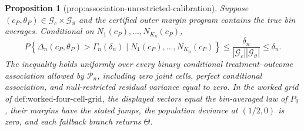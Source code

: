\documentclass{article}
\newtheorem{proposition}{Proposition}
\begin{document}
\begin{proposition}[prop:association-unrestricted-calibration]\label{prop:association-unrestricted-calibration}
Suppose \((c_P,\theta_P)\in\mathcal G_c\times\mathcal G_\vartheta\) and the certified outer margin program contains the true bin averages. Conditional on \(N_1(c_P),\ldots,N_{K_n}(c_P)\), \[P\!\left\{\Delta_n(c_P,\theta_P)>\Gamma_n(\delta_n)\mid N_1(c_P),\ldots,N_{K_n}(c_P)\right\}\le\frac{\delta_n}{|\mathcal G_c||\mathcal G_\vartheta|}\le\delta_n.\] The inequality holds uniformly over every binary conditional treatment--outcome association allowed by \(\mathcal P_n\), including zero joint cells, perfect conditional association, and null-restricted residual variance equal to zero. In the worked grid of \(\text{def:worked-four-cell-grid}\), the displayed vectors equal the bin-averaged law of \(P_0\), their margins have the stated jumps, the population deviance at \((1/2,0)\) is zero, and each fallback branch returns \(\Theta\).
\end{proposition}
\end{document}

